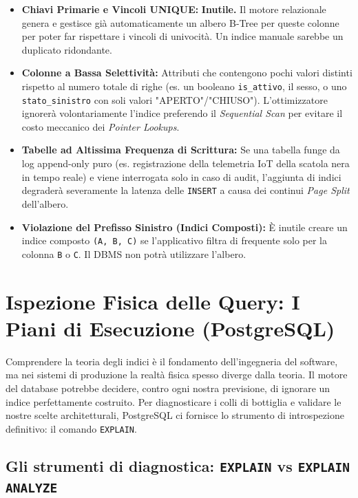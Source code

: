 \begin{itemize}
    \item \textbf{Chiavi Primarie e Vincoli UNIQUE:} \textbf{Inutile.} Il motore relazionale genera e gestisce già automaticamente un albero B-Tree per queste colonne per poter far rispettare i vincoli di univocità. Un indice manuale sarebbe un duplicato ridondante.
    \item \textbf{Colonne a Bassa Selettività:} Attributi che contengono pochi valori distinti rispetto al numero totale di righe (es. un booleano \texttt{is\_attivo}, il sesso, o uno \texttt{stato\_sinistro} con soli valori "APERTO"/"CHIUSO"). L'ottimizzatore ignorerà volontariamente l'indice preferendo il \textit{Sequential Scan} per evitare il costo meccanico dei \textit{Pointer Lookups}.
    \item \textbf{Tabelle ad Altissima Frequenza di Scrittura:} Se una tabella funge da log append-only puro (es. registrazione della telemetria IoT della scatola nera in tempo reale) e viene interrogata solo in caso di audit, l'aggiunta di indici degraderà severamente la latenza delle \texttt{INSERT} a causa dei continui \textit{Page Split} dell'albero.
    \item \textbf{Violazione del Prefisso Sinistro (Indici Composti):} È inutile creare un indice composto \texttt{(A, B, C)} se l'applicativo filtra di frequente solo per la colonna \texttt{B} o \texttt{C}. Il DBMS non potrà utilizzare l'albero.
\end{itemize}

\section{Ispezione Fisica delle Query: I Piani di Esecuzione (PostgreSQL)}

Comprendere la teoria degli indici è il fondamento dell'ingegneria del software, ma nei sistemi di produzione la realtà fisica spesso diverge dalla teoria. Il motore del database potrebbe decidere, contro ogni nostra previsione, di ignorare un indice perfettamente costruito. Per diagnosticare i colli di bottiglia e validare le nostre scelte architetturali, PostgreSQL ci fornisce lo strumento di introspezione definitivo: il comando \texttt{EXPLAIN}.

\subsection{Gli strumenti di diagnostica: \texttt{EXPLAIN} vs \texttt{EXPLAIN ANALYZE}}


